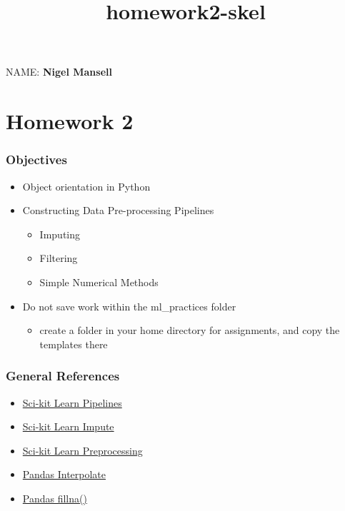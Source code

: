 \documentclass[11pt]{article}
\title{homework2-skel}
\providecommand{\tightlist}{%
      \setlength{\itemsep}{0pt}\setlength{\parskip}{0pt}}
\begin{document}
    
    
    \maketitle
    
    

    
    NAME: \textbf{Nigel Mansell}

\hypertarget{homework-2}{%
\section{Homework 2}\label{homework-2}}

\hypertarget{objectives}{%
\subsubsection{Objectives}\label{objectives}}

\begin{itemize}
\tightlist
\item
  Object orientation in Python
\item
  Constructing Data Pre-processing Pipelines

  \begin{itemize}
  \tightlist
  \item
    Imputing
  \item
    Filtering
  \item
    Simple Numerical Methods
  \end{itemize}
\item
  Do not save work within the ml\_practices folder

  \begin{itemize}
  \tightlist
  \item
    create a folder in your home directory for assignments, and copy the
    templates there
  \end{itemize}
\end{itemize}

\hypertarget{general-references}{%
\subsubsection{General References}\label{general-references}}

\begin{itemize}
\tightlist
\item
  \href{https://scikit-learn.org/stable/modules/generated/sklearn.pipeline.Pipeline.html}{Sci-kit
  Learn Pipelines}
\item
  \href{https://scikit-learn.org/stable/modules/classes.html\#module-sklearn.impute}{Sci-kit
  Learn Impute}
\item
  \href{https://scikit-learn.org/stable/modules/classes.html\#module-sklearn.preprocessing}{Sci-kit
  Learn Preprocessing}
\item
  \href{https://pandas.pydata.org/pandas-docs/version/0.16/generated/pandas.DataFrame.interpolate.html}{Pandas
  Interpolate}
\item
  \href{https://pandas.pydata.org/pandas-docs/stable/reference/api/pandas.DataFrame.fillna.html}{Pandas
  fillna()}
\end{itemize}
\end{document}

